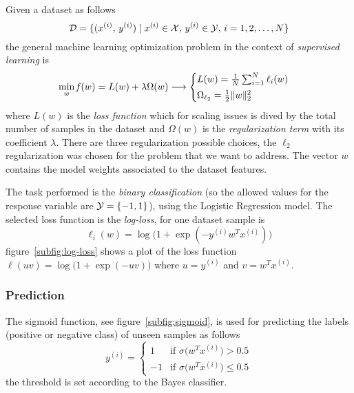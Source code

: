 Given a dataset as follows
\[
\mathcal{D}=\{(x^{(i)},\,y^{(i)})\mid x^{(i)}\in\mathcal{X},\,y^{(i)}\in\mathcal{Y},\,i=1,2,\dots,N\}
\]
the general machine learning optimization problem in the context of \emph{supervised learning} is
\[
\min_{w}\operatorname*{\mathit{f}}(w)=L(w)+\lambda\Omega(w)\longrightarrow
\begin{cases}
L(w)=\frac{1}{N}\sum_{i=1}^N\ell_i(w) \\[0.5ex]
\Omega_{\ell_2}=\frac{1}{2}\lVert w\rVert_2^2
\end{cases}
\]
where $L(w)$ is the \emph{loss function} which for scaling issues is dived by the total number of samples in the dataset and $\Omega(w)$ is the \emph{regularization term} with its coefficient $\lambda$. There are three regularization possible choices, the $\ell_2$ regularization was chosen for the problem that we want to address. The vector $w$ contains the model weights associated to the dataset features.

The task performed is the \emph{binary classification} (so the allowed values for the response variable are $\mathcal{Y}=\{-1,1\}$), using the Logistic Regression model. The selected loss function is the \emph{log-loss}, for one dataset sample is
\begin{equation}\label{eq:sample_loss}
\ell_i(w)=\log\bigl(1+\exp(-y^{(i)}w^Tx^{(i)})\bigr)
\end{equation}
figure~\vref{subfig:log-loss} shows a plot of the loss function $\ell(uv)=\log\bigl(1+\exp(-uv)\bigr)$ where $u=y^{(i)}$ and $v=w^Tx^{(i)}$.

\subsubsection*{Prediction}

The sigmoid function, see figure~\vref{subfig:sigmoid}, is used for predicting the labels (positive or negative class) of unseen samples as follows
\[
y^{(i)}=
\begin{cases}
1  & \text{if $\sigma\bigl(w^Tx^{(i)}\bigr)>0.5$} \\
-1 & \text{if $\sigma\bigl(w^Tx^{(i)}\bigr)\leq0.5$}
\end{cases}
\]
the threshold is set according to the Bayes classifier.


